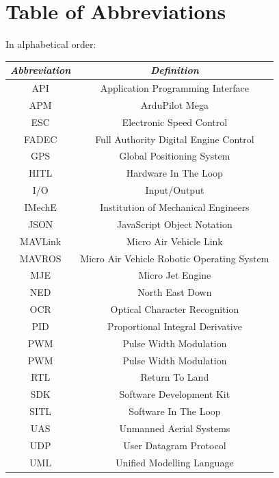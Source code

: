 \documentclass[11pt,twoside]{article}
\begin{document}
\section{Table of Abbreviations}
\begin{center}
    In alphabetical order:
    \begin{longtable}{|cc|}
        \hline
        \emph{Abbreviation} & \emph{Definition} \\
        \hline \endhead
        API & Application Programming Interface \\
        APM & ArduPilot Mega \\
        ESC & Electronic Speed Control \\
        FADEC & Full Authority Digital Engine Control \\
        GPS & Global Positioning System \\
        HITL & Hardware In The Loop \\
        I/O & Input/Output \\
        IMechE & Institution of Mechanical Engineers \\
        JSON & JavaScript Object Notation \\
        MAVLink & Micro Air Vehicle Link \\
        MAVROS & Micro Air Vehicle Robotic Operating System \\
        MJE & Micro Jet Engine \\
        NED & North East Down \\
        OCR & Optical Character Recognition \\
        PID & Proportional Integral Derivative \\
        PWM & Pulse Width Modulation \\
        PWM & Pulse Width Modulation \\
        RTL & Return To Land \\
        SDK & Software Development Kit \\
        SITL & Software In The Loop \\
        UAS & Unmanned Aerial Systems \\
        UDP & User Datagram Protocol \\
        UML & Unified Modelling Language \\
        \hline
    \end{longtable}
\end{center}
\end{document}
